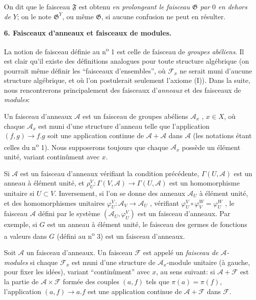 On dit que le faisceau $\mathfrak{F}$ est obtenu \textit{en prolongeant le faisceau $\mathfrak{G}$ par $0$ en dehors de $Y$}; on le note $\mathfrak{G}^{Y}$, ou même $\mathfrak{G}$, si aucune confusion ne peut en résulter.


\textbf{6. Faisceaux d'anneaux et faisceaux de modules.}

La notion de faisceau définie au n\textsuperscript{o} 1 est celle de faisceau de \textit{groupes abéliens}. Il est clair qu'il existe
des définitions analogues pour toute structure algébrique (on pourrait même définir les ``faisceaux d'ensembles'', où $\mathcal{F}_x$ ne serait muni d'aucune structure algébrique, et où l'on postulerait seulement l'axiome (I)). Dans la suite, nous rencontrerons principalement des faisceaux d'\emph{anneaux} et des faisceaux de \emph{modules}:

Un faisceau d'anneaux $\mathcal{A}$ est un faisceau de groupes abéliens $\mathcal{A}_x$ , $x \in X$, où chaque $\mathcal{A}_x$ est muni d'une structure d'anneau telle que l'application $(f, g) \to f.g$ soit une application continue de $\mathcal{A} + \mathcal{A}$ dans $\mathcal{A}$ (les notations étant celles du n\textsuperscript{o} 1). Nous supposerons toujours que chaque $\mathcal{A}_x$ possède un élément unité, variant continûment avec $x$.

Si $\mathcal{A}$ est un faisceau d'anneaux vérifiant la condition précédente, $\Gamma(U, \mathcal{A})$ est un anneau à élément unité, et $\rho_U^V : \Gamma(V, \mathcal{A}) \to \Gamma(U, \mathcal{A})$ est un homomorphisme unitaire si $U \subset V$. Inversement, si l'on se donne des anneaux $\mathcal{A}_U$ à élément unité, et des homomorphismes unitaires $\varphi_U^V : \mathcal{A}_V \to \mathcal{A}_U$ , vérifiant $\varphi_U^V \circ \varphi_V^W = \varphi_U^W$ , le faisceau $\mathcal{A}$ défini par le système $(\mathcal{A}_U , \varphi_U^V)$ est un faisceau d'anneaux. Par exemple, si $G$ est un anneau à élément unité, le faisceau des germes de fonctions a valeurs dans $G$ (défini au n\textsuperscript{o} 3) est un faisceau d'anneaux.

Soit $\mathcal{A}$ un faisceau d'anneaux. Un faisceau $\mathcal{F}$ est appelé un \emph{faisceau de $\mathcal{A}$-modules} si chaque $\mathcal{F}_x$ est muni d'une structure de $\mathcal{A}_x$-module unitaire (à gauche, pour fixer les idées), variant ``continûment'' avec $x$, au sens suivant: si $\mathcal{A} + \mathcal{F}$ est la partie de $\mathcal{A} \times \mathcal{F}$ formée des couples $(a, f)$ tels que $\pi(a) = \pi(f)$, l'application $(a, f) \to a.f$ est une application continue de $\mathcal{A} + \mathcal{F}$ dans $\mathcal{F}$.

